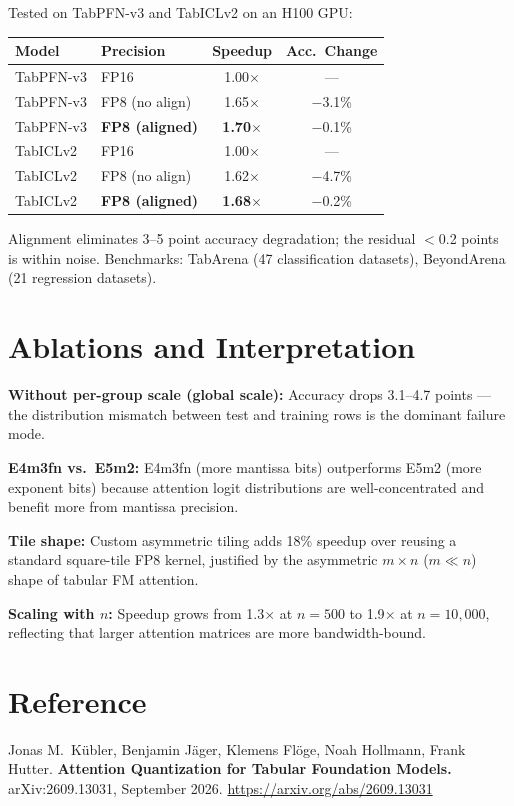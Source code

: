 \documentclass[10pt,twocolumn]{article}
\begin{document}
Tested on TabPFN-v3 and TabICLv2 on an H100 GPU:

\begin{center}
\begin{tabular}{llcc}
\toprule
Model & Precision & Speedup & Acc.\ Change \\
\midrule
TabPFN-v3 & FP16            & 1.00$\times$ & --- \\
TabPFN-v3 & FP8 (no align)  & 1.65$\times$ & $-$3.1\% \\
TabPFN-v3 & \textbf{FP8 (aligned)} & \textbf{1.70}$\times$ & $-$0.1\% \\
\midrule
TabICLv2  & FP16            & 1.00$\times$ & --- \\
TabICLv2  & FP8 (no align)  & 1.62$\times$ & $-$4.7\% \\
TabICLv2  & \textbf{FP8 (aligned)} & \textbf{1.68}$\times$ & $-$0.2\% \\
\bottomrule
\end{tabular}
\end{center}

Alignment eliminates 3--5 point accuracy degradation; the residual
$<$0.2 points is within noise. Benchmarks: TabArena (47 classification
datasets), BeyondArena (21 regression datasets).

\section{Ablations and Interpretation}

\textbf{Without per-group scale (global scale):} Accuracy drops
3.1--4.7 points --- the distribution mismatch between test and training
rows is the dominant failure mode.

\textbf{E4m3fn vs.\ E5m2:} E4m3fn (more mantissa bits) outperforms
E5m2 (more exponent bits) because attention logit distributions are
well-concentrated and benefit more from mantissa precision.

\textbf{Tile shape:} Custom asymmetric tiling adds 18\% speedup over
reusing a standard square-tile FP8 kernel, justified by the
asymmetric $m\times n$ ($m \ll n$) shape of tabular FM attention.

\textbf{Scaling with $n$:} Speedup grows from 1.3$\times$ at
$n=500$ to 1.9$\times$ at $n=10{,}000$, reflecting that larger
attention matrices are more bandwidth-bound.

\section*{Reference}

Jonas M.\ K\"ubler, Benjamin J\"ager, Klemens Fl\"oge, Noah Hollmann,
Frank Hutter. \textbf{Attention Quantization for Tabular Foundation
Models.} arXiv:2609.13031, September 2026.
\url{https://arxiv.org/abs/2609.13031}
\end{document}
